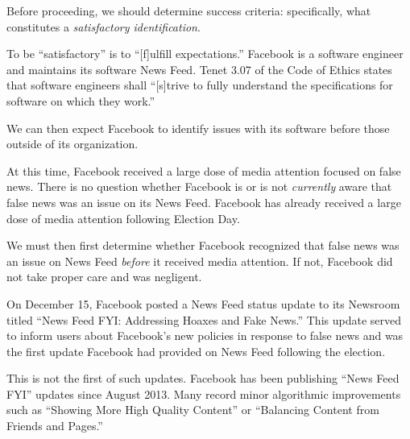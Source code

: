 
\par Before proceeding, we should determine success criteria: specifically, what constitutes a \emph{satisfactory identification}.

\par To be ``satisfactory'' is to ``[f]ulfill expectations.'' \cite{oxford} Facebook is a software engineer and maintains its software News Feed. Tenet 3.07 of the Code of Ethics states that software engineers shall ``[s]trive to fully understand the specifications for software on which they work.'' \cite{se_code}

\par We can then expect Facebook to identify issues with its software before those outside of its organization.

\par At this time, Facebook received a large dose of media attention focused on false news. \cite{tc_snowden} There is no question whether Facebook is or is not \emph{currently} aware that false news was an issue on its News Feed. Facebook has already received a large dose of media attention following Election Day. \cite{tc_snowden}

\par We must then first determine whether Facebook recognized that false news was an issue on News Feed \emph{before} it received media attention. If not, Facebook did not take proper care and was negligent.

\label{recognize}

\par On December 15, Facebook posted a News Feed status update to its Newsroom titled ``News Feed FYI: Addressing Hoaxes and Fake News.'' \cite{fb_hoaxes_2016} This update served to inform users about Facebook's new policies in response to false news and was the first update Facebook had provided on News Feed following the election. \cite{fb_hoaxes_2016}

\par This is not the first of such updates. Facebook has been publishing ``News Feed FYI'' updates since August 2013. \cite{fb_newsroom} Many record minor algorithmic improvements such as ``Showing More High Quality Content'' or ``Balancing Content from Friends and Pages.'' \cite{fb_newsroom} 


